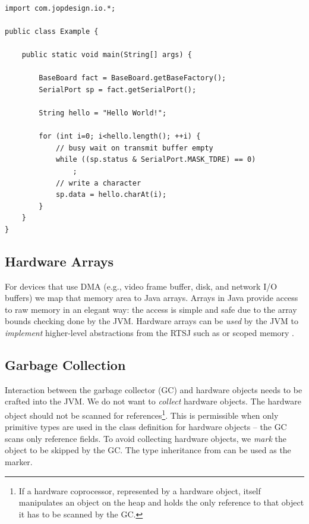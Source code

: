 \begin{lstlisting}[float=t,caption={A `Hello World' example with low-level device
access via a hardware object},
label=lst:hwo:hello:world]

import com.jopdesign.io.*;

public class Example {

    public static void main(String[] args) {

        BaseBoard fact = BaseBoard.getBaseFactory();
        SerialPort sp = fact.getSerialPort();

        String hello = "Hello World!";

        for (int i=0; i<hello.length(); ++i) {
            // busy wait on transmit buffer empty
            while ((sp.status & SerialPort.MASK_TDRE) == 0)
                ;
            // write a character
            sp.data = hello.charAt(i);
        }
    }
}
\end{lstlisting}


\subsection{Hardware Arrays}

For devices that use DMA (e.g., video frame buffer, disk, and network
I/O buffers) we map that memory area to Java arrays. Arrays in Java
provide access to raw memory in an elegant way: the access is simple
and safe due to the array bounds checking done by the JVM. Hardware
arrays can be \emph{used} by the JVM to \emph{implement} higher-level
abstractions from the RTSJ such as  or scoped memory
\cite{jop:scope:cache}.

\subsection{Garbage Collection}

Interaction between the garbage collector (GC) and hardware objects
needs to be crafted into the JVM. We do not want to \emph{collect}
hardware objects. The hardware object should not be scanned for
references\footnote{If a hardware coprocessor, represented by a
hardware object, itself manipulates an object on the heap and holds
the only reference to that object it has to be scanned by the GC.}.
This is permissible when only primitive types are used in the class
definition for hardware objects -- the GC scans only reference
fields. To avoid collecting hardware objects, we \emph{mark} the
object to be skipped by the GC. The type inheritance from
 can be used as the marker.

